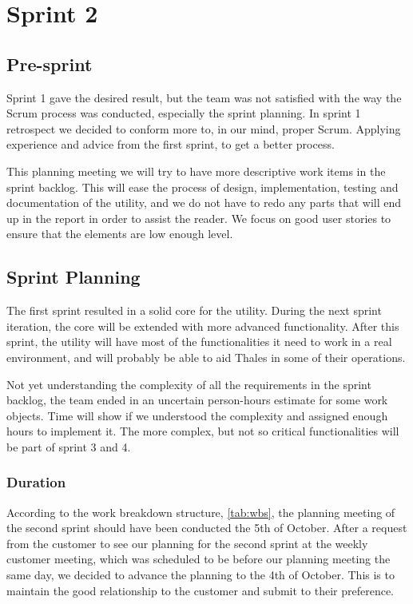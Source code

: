 \chapter{Sprint 2}

\section{Pre-sprint}
Sprint 1 gave the desired result, but the team was not satisfied with the way the Scrum process was conducted, especially the sprint planning. In sprint 1 retrospect we decided to conform more to, in our mind, proper Scrum. Applying experience and advice from the first sprint, to get a better process. 

This planning meeting we will try to have more descriptive work items in the sprint backlog. This will ease the process of design, implementation, testing and documentation of the utility, and we do not have to redo any parts that will end up in the report in order to assist the reader. We focus on good user stories to ensure that the elements are low enough level.


\section{Sprint Planning}
The first sprint resulted in a solid core for the utility. During the next sprint iteration, the core will be extended with more advanced functionality. After this sprint, the utility will have most of the functionalities it need to work in a real environment, and will probably be able to aid Thales in some of their operations.

Not yet understanding the complexity of all the requirements in the sprint backlog, the team ended in an uncertain person-hours estimate for some work objects. Time will show if we understood the complexity and assigned enough hours to implement it. The more complex, but not so critical functionalities will be part of sprint 3 and 4.   



\subsection{Duration}
According to the work breakdown structure, \autoref{tab:wbs}, the planning meeting of the second sprint should have been conducted the 5th of October. After a request from the customer to see our planning for the second sprint at the weekly customer meeting, which was scheduled to be before our planning meeting the same day, we decided to advance the planning to the 4th of October. This is to maintain the good relationship to the customer and submit to their preference.

